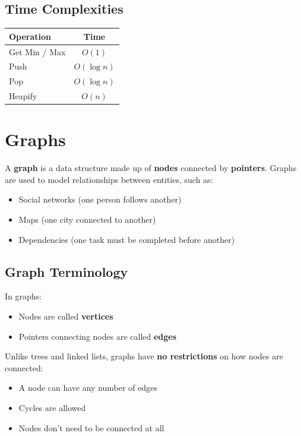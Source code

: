 \documentclass{article}
\begin{document}
\subsection{Time Complexities}
\begin{center}
\begin{tabular}{l c}
\toprule
Operation & Time \\
\midrule
Get Min / Max & $O(1)$ \\
Push & $O(\log n)$ \\
Pop & $O(\log n)$ \\
Heapify & $O(n)$ \\
\bottomrule
\end{tabular}
\end{center}

\section{Graphs}

A \textbf{graph} is a data structure made up of \textbf{nodes} connected by \textbf{pointers}.
Graphs are used to model relationships between entities, such as:
\begin{itemize}
  \item Social networks (one person follows another)
  \item Maps (one city connected to another)
  \item Dependencies (one task must be completed before another)
\end{itemize}

\subsection{Graph Terminology}

In graphs:
\begin{itemize}
  \item Nodes are called \textbf{vertices}
  \item Pointers connecting nodes are called \textbf{edges}
\end{itemize}

Unlike trees and linked lists, graphs have \textbf{no restrictions} on how nodes are connected:
\begin{itemize}
  \item A node can have any number of edges
  \item Cycles are allowed
  \item Nodes don't need to be connected at all
\end{itemize}
\end{document}
